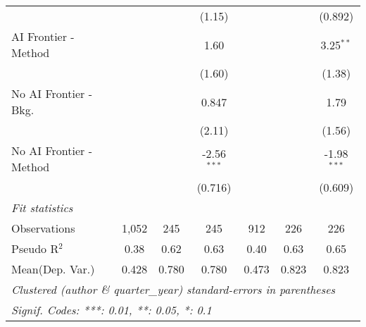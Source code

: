 \begin{tabular}{lcccccc}
                           &              &              & (1.15)        &               &              & (0.892)\\   
   AI Frontier - Method    &              &              & 1.60          &               &              & 3.25$^{**}$\\   
                           &              &              & (1.60)        &               &              & (1.38)\\   
   No AI Frontier - Bkg.   &              &              & 0.847         &               &              & 1.79\\   
                           &              &              & (2.11)        &               &              & (1.56)\\   
   No AI Frontier - Method &              &              & -2.56$^{***}$ &               &              & -1.98$^{***}$\\   
                           &              &              & (0.716)       &               &              & (0.609)\\   
   \midrule
   \emph{Fit statistics}\\
   Observations            & 1,052        & 245          & 245           & 912           & 226          & 226\\  
   Pseudo R$^2$            & 0.38         & 0.62         & 0.63          & 0.40          & 0.63         & 0.65\\  
Mean(Dep. Var.) & 0.428 & 0.780 & 0.780 & 0.473 & 0.823 & 0.823 \\
   \midrule \midrule
   \multicolumn{7}{l}{\emph{Clustered (author \& quarter\_year) standard-errors in parentheses}}\\
   \multicolumn{7}{l}{\emph{Signif. Codes: ***: 0.01, **: 0.05, *: 0.1}}\\
\end{tabular}
\par\endgroup
